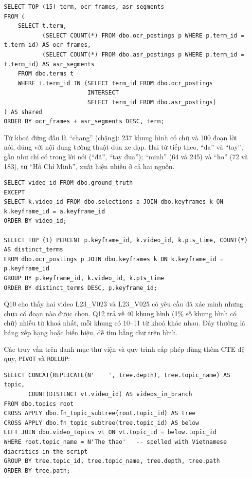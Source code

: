 \begin{lstlisting}[caption={Q9. Từ khoá xuất hiện ở cả OCR và ASR bằng INTERSECT}, label={lst:q9}]
SELECT TOP (15) term, ocr_frames, asr_segments
FROM (
    SELECT t.term,
           (SELECT COUNT(*) FROM dbo.ocr_postings p WHERE p.term_id = t.term_id) AS ocr_frames,
           (SELECT COUNT(*) FROM dbo.asr_postings p WHERE p.term_id = t.term_id) AS asr_segments
    FROM dbo.terms t
    WHERE t.term_id IN (SELECT term_id FROM dbo.ocr_postings
                        INTERSECT
                        SELECT term_id FROM dbo.asr_postings)
) AS shared
ORDER BY ocr_frames + asr_segments DESC, term;
\end{lstlisting}

Từ khoá đứng đầu là ``chang'' (chặng): 237 khung hình có chữ và 100 đoạn lời nói, đúng
với nội dung tường thuật đua xe đạp. Hai từ tiếp theo, ``da'' và ``tay'', gần như chỉ có trong
lời nói (``đã'', ``tay đua''); ``minh'' (64 và 245) và ``ho'' (72 và 183), từ ``Hồ Chí Minh'',
xuất hiện nhiều ở cả hai nguồn.

\begin{lstlisting}[caption={Q10 (EXCEPT) và Q12 (TOP PERCENT)}, label={lst:q10}]
SELECT video_id FROM dbo.ground_truth
EXCEPT
SELECT k.video_id FROM dbo.selections a JOIN dbo.keyframes k ON k.keyframe_id = a.keyframe_id
ORDER BY video_id;

SELECT TOP (1) PERCENT p.keyframe_id, k.video_id, k.pts_time, COUNT(*) AS distinct_terms
FROM dbo.ocr_postings p JOIN dbo.keyframes k ON k.keyframe_id = p.keyframe_id
GROUP BY p.keyframe_id, k.video_id, k.pts_time
ORDER BY distinct_terms DESC, p.keyframe_id;
\end{lstlisting}

Q10 cho thấy hai video L23\_V023 và L23\_V025 có yêu cầu đã xác minh nhưng chưa có đoạn
nào được chọn. Q12 trả về 40 khung hình (1\% số khung hình có chữ) nhiều từ khoá nhất, mỗi khung
có 10--11 từ khoá khác nhau. Đây thường là bảng xếp hạng hoặc biển hiệu, dễ tìm bằng
chữ trên hình.

Các truy vấn trên danh mục thư viện và quy trình cấp phép dùng thêm CTE đệ quy,
\texttt{PIVOT} và \texttt{ROLLUP}:

\begin{lstlisting}[caption={Q19. Số video theo nhánh của cây chủ đề}, label={lst:q19}]
SELECT CONCAT(REPLICATE(N'    ', tree.depth), tree.topic_name) AS topic,
       COUNT(DISTINCT vt.video_id) AS videos_in_branch
FROM dbo.topics root
CROSS APPLY dbo.fn_topic_subtree(root.topic_id) AS tree
CROSS APPLY dbo.fn_topic_subtree(tree.topic_id) AS below
LEFT JOIN dbo.video_topics vt ON vt.topic_id = below.topic_id
WHERE root.topic_name = N'The thao'   -- spelled with Vietnamese diacritics in the script
GROUP BY tree.topic_id, tree.topic_name, tree.depth, tree.path
ORDER BY tree.path;
\end{lstlisting}

